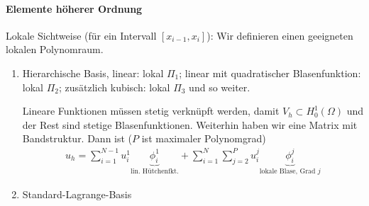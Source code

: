 \paragraph{Elemente höherer Ordnung}
Lokale Sichtweise (für ein Intervall $[x_{i-1}, x_{i}]$): Wir definieren einen geeigneten lokalen Polynomraum.
\begin{enumerate}
\item Hierarchische Basis, linear: lokal $\Pi_{1}$; linear mit quadratischer Blasenfunktion: lokal $\Pi_{2}$; zusätzlich kubisch: lokal $\Pi_{3}$ und so weiter. 

  Lineare Funktionen müssen stetig verknüpft werden, damit $V_{h} \subset H_{0}^{1}(\Omega)$ und der Rest sind stetige Blasenfunktionen. Weiterhin haben wir eine Matrix mit Bandstruktur. Dann ist ($P$ ist maximaler Polynomgrad)
  \begin{align*}
    u_{h} =  \sum_{i = 1}^{N-1} u^{1}_{i} \underbrace{\phi_{i}^{1}}_{\text{lin. Hütchenfkt.}} + \sum_{i = 1}^{N} \sum_{j = 2}^{P} u_{i}^{j} \underbrace{\phi_{i}^{j}}_{\text{lokale Blase, Grad }j}
  \end{align*}

\item Standard-Lagrange-Basis
\end{enumerate}

